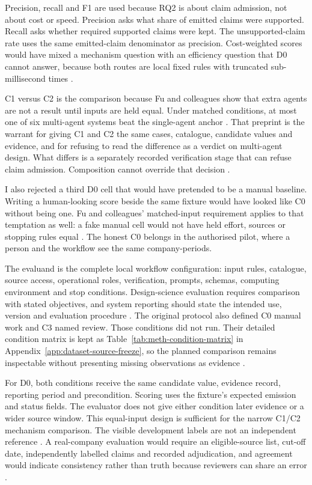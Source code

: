 Precision, recall and F1 are used because RQ2 is about claim admission, not about cost or speed.
Precision asks what share of emitted claims were supported. Recall asks whether required supported
claims were kept. The unsupported-claim rate uses the same emitted-claim denominator as precision.
Cost-weighted scores would have mixed a mechanism question with an efficiency question that D0
cannot answer, because both routes are local fixed rules with truncated sub-millisecond times
\citep{gao2023alce,gao2023rarr}.

C1 versus C2 is the comparison because Fu and colleagues show that extra agents are not a result
until inputs are held equal. Under matched conditions, at most one of six multi-agent systems beat
the single-agent anchor \citep{fu2026agents,guo2024multiagent}. That preprint is the warrant for
giving C1 and C2 the same cases, catalogue, candidate values and evidence, and for refusing to read
the difference as a verdict on multi-agent design. What differs is a separately recorded verification
stage that can refuse claim admission. Composition cannot override that decision
\citep{wu2024autogen,peffers2007dsrm}.

I also rejected a third D0 cell that would have pretended to be a manual baseline. Writing a
human-looking score beside the same fixture would have looked like C0 without being one. Fu and
colleagues' matched-input requirement applies to that temptation as well: a fake manual cell
would not have held effort, sources or stopping rules equal
\citep{fu2026agents,kapoor2023leakage}. The honest C0 belongs in the authorised pilot, where a
person and the workflow see the same company-periods.

The evaluand is the complete local workflow configuration: input rules, catalogue, source access,
operational roles, verification, prompts, schemas, computing environment and stop conditions.
Design-science evaluation requires comparison with stated objectives, and system reporting should
state the intended use, version and evaluation procedure
\citep{hevner2004design,mitchell2019modelcards}. The original protocol also defined C0 manual work
and C3 named review. Those conditions did not run. Their detailed condition matrix is kept as
Table~\ref{tab:meth-condition-matrix} in Appendix~\ref{app:dataset-source-freeze}, so the planned
comparison remains inspectable without presenting missing observations as evidence
\citep{pineau2021reproducibility,nist2023airmf}.

For D0, both conditions receive the same candidate value, evidence record, reporting period and
precondition. Scoring uses the fixture's expected emission and status fields. The evaluator does not
give either condition later evidence or a wider source window. This equal-input design is sufficient
for the narrow C1/C2 mechanism comparison. The visible development labels are not an independent
reference \citep{kapoor2023leakage,pineau2021reproducibility}. A real-company evaluation would
require an eligible-source list, cut-off date, independently labelled claims and recorded
adjudication, and agreement would indicate consistency rather than truth because reviewers can share
an error \citep{artstein2008agreement,gao2023alce}.

